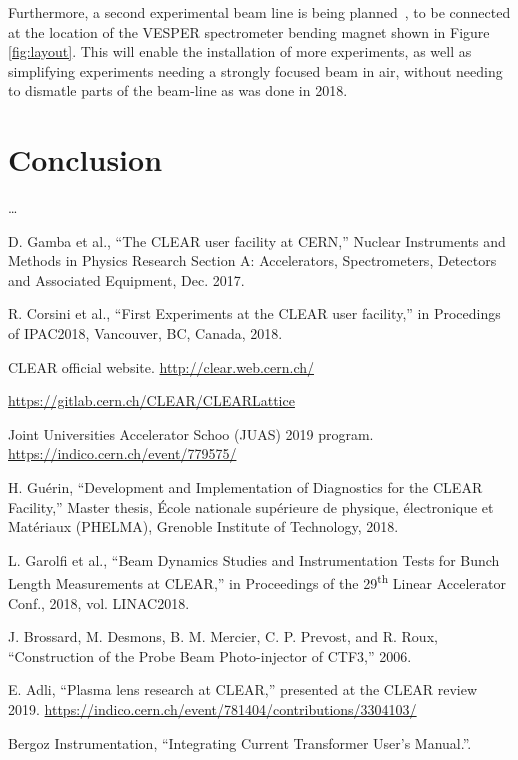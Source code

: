 \documentclass[a4paper,
               keeplastbox,   %
               ]{jacow}
\begin{document}
Furthermore, a second experimental beam line is being planned~\cite{Roberto::CLEARrev}, to be connected at the location of the VESPER spectrometer bending magnet shown in Figure \ref{fig:layout}.
This will enable the installation of more experiments, as well as simplifying experiments needing a strongly focused beam in air, without needing to dismatle parts of the beam-line as was done in 2018.

\section{Conclusion}

\ldots

\begin{thebibliography}{99}
 D. Gamba et al., “The CLEAR user facility at CERN,” Nuclear Instruments and Methods in Physics Research Section A: Accelerators, Spectrometers, Detectors and Associated Equipment, Dec. 2017.

 R. Corsini et al., “First Experiments at the CLEAR user facility,” in Procedings of IPAC2018, Vancouver, BC, Canada, 2018.

 CLEAR official website. \url{http://clear.web.cern.ch/}

 \url{https://gitlab.cern.ch/CLEAR/CLEARLattice}

 Joint Universities Accelerator Schoo (JUAS) 2019 program. \url{https://indico.cern.ch/event/779575/}

 H. Guérin, “Development and Implementation of Diagnostics for the CLEAR Facility,” Master thesis, École nationale supérieure de physique, électronique et Matériaux (PHELMA), Grenoble Institute of Technology, 2018.

 L. Garolfi et al., “Beam Dynamics Studies and Instrumentation Tests for Bunch Length Measurements at CLEAR,” in Proceedings of the 29\textsuperscript{th} Linear Accelerator Conf., 2018, vol. LINAC2018.

 J. Brossard, M. Desmons, B. M. Mercier, C. P. Prevost, and R. Roux, “Construction of the Probe Beam Photo-injector of CTF3,” 2006.

 E. Adli, ``Plasma lens research at CLEAR,'' presented at the CLEAR review 2019. \url{https://indico.cern.ch/event/781404/contributions/3304103/}

 Bergoz Instrumentation, “Integrating Current Transformer User’s Manual.”.


\end{thebibliography}
\end{document}
